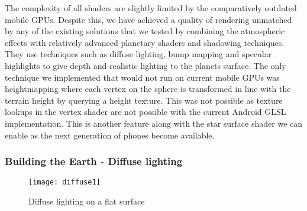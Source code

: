 The complexity of all shaders are slightly limited by the comparatively outdated mobile GPUs. Despite this, we have achieved a quality of rendering unmatched by any of the existing solutions that we tested by combining the atmospheric effects with relatively advanced planetary shaders and shadowing techniques. They use techniques such as diffuse lighting, bump mapping and specular highlights to give depth and realistic lighting to the planets surface. The only technique we implemented that would not run on current mobile GPUs was heightmapping where each vertex on the sphere is transformed in line with the terrain height by querying a height texture. This was not possible as texture lookups in the vertex shader are not possible with the current Android GLSL implementation. This is another feature along with the star surface shader we can enable as the next generation of phones become available.

\subsubsection{Building the Earth - Diffuse lighting}

\begin{figure}[!htbp]
\centering
  \centering
  \texttt{[image: diffuse1]}
  \caption{Diffuse lighting on a flat surface}
  \label{fig:diffuse1}
\end{figure}

